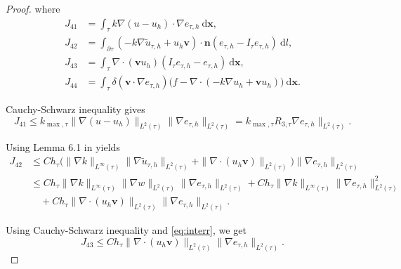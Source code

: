 \documentclass[times]{nlaauth}
\numberwithin{equation}{section}
\begin{document}
\begin{proof}
\noindent
where
\begin{equation*}
\begin{aligned}
J_{41} & = \int_\tau k \nabla (u - u_h) \cdot \nabla e_{\tau, h} \ \text{d} \boldsymbol{x}, \\
J_{42} & = \int_{\partial\tau} ( -k \nabla \widetilde u_{\tau, h} + u_h \boldsymbol{v} ) \cdot \boldsymbol{n} ( e_{\tau, h} - I_\tau e_{\tau, h} ) \ \text{d} l, \\
J_{43} & = \int_\tau \nabla \cdot ( \boldsymbol{v} u_h ) ( I_\tau e_{\tau, h} - e_{\tau, h} ) \ \text{d} \boldsymbol{x},\\
J_{44} & = \int_\tau \delta ( \boldsymbol{v}  \cdot \nabla e_{\tau, h}) \big( f - \nabla \cdot ( -k\nabla u_h + \boldsymbol{v} u_h ) \big)   \ \text{d} \boldsymbol{x}.
\end{aligned}
\end{equation*}

\noindent
Cauchy-Schwarz inequality gives
\begin{equation} \label{eq:pJ41}
J_{41} \leq k_{\max, \tau} \| \nabla (u - u_h) \|_{L^2{(\tau)}}  \| \nabla e_{\tau, h} \|_{L^2{(\tau)}} = 
k_{\max, \tau} R_{3,\tau} \nabla e_{\tau, h} \|_{L^2{(\tau)}}.
\end{equation}

\noindent
Using Lemma 6.1 in \cite{chatzipantelidis2002finite} yields 
\begin{equation} \label{eq:pJ42}
\begin{aligned}
J_{42} & \leq Ch_\tau \big( \| \nabla k \|_{L^\infty(\tau)}  \| \nabla \widetilde u_{\tau, h} \|_{L^2{(\tau)}} + \| \nabla \cdot (u_h \boldsymbol{v} ) \|_{L^2{(\tau)}} \big) \| \nabla e_{\tau, h} \|_{L^2{(\tau)}}  \\
& \leq Ch_\tau \| \nabla k \|_{L^\infty(\tau)}  \| \nabla w \|_{L^2{(\tau)}}  \| \nabla e_{\tau, h} \|_{L^2{(\tau)}} + Ch_\tau \| \nabla k \|_{L^\infty(\tau)}  \| \nabla e_{\tau, h} \|^2_{L^2{(\tau)}} \\
& \quad + Ch_\tau \| \nabla \cdot (u_h \boldsymbol{v} ) \|_{L^2{(\tau)}} \| \nabla e_{\tau, h} \|_{L^2{(\tau)}} .
\end{aligned}
\end{equation}

\noindent
Using  Cauchy-Schwarz inequality and \eqref{eq:interr}, we get
\begin{equation} \label{eq:pJ43}
J_{43}  \leq Ch_\tau \| \nabla \cdot (u_h \boldsymbol{v} ) \|_{L^2{(\tau)}} \| \nabla e_{\tau, h} \|_{L^2{(\tau)}}.
\end{equation}


\end{proof}
\end{document}
